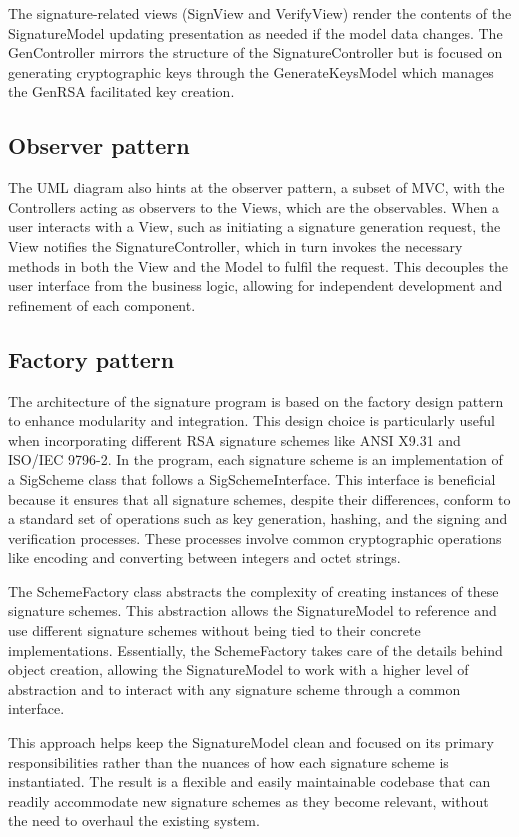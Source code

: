 \documentclass[]{final_report}
\theoremstyle{definition}
\begin{document}
The signature-related views (SignView and VerifyView) render the contents of the SignatureModel updating presentation as needed if the model data changes.
The GenController mirrors the structure of the SignatureController but  is focused on generating cryptographic keys through the GenerateKeysModel which manages the GenRSA facilitated key creation.

\subsection{Observer pattern}
The UML diagram also hints at the observer pattern, a subset of MVC, with the Controllers acting as observers to the Views, which are the observables. When a user interacts with a View, such as initiating a signature generation request, the View notifies the SignatureController, which in turn invokes the necessary methods in both the View and the Model to fulfil the request. This decouples the user interface from the business logic, allowing for independent development and refinement of each component.

\subsection{Factory pattern}
The architecture of the signature program is based on the factory design pattern to enhance modularity and integration. This design choice is particularly useful when incorporating different RSA signature schemes like ANSI X9.31 and ISO/IEC 9796-2. In the program, each signature scheme is an implementation of a SigScheme class that follows a SigSchemeInterface. This interface is beneficial because it ensures that all signature schemes, despite their differences, conform to a standard set of operations such as key generation, hashing, and the signing and verification processes. These processes involve common cryptographic operations like encoding and converting between integers and octet strings.

The SchemeFactory class abstracts the complexity of creating instances of these signature schemes. This abstraction allows the SignatureModel to reference and use different signature schemes without being tied to their concrete implementations. Essentially, the SchemeFactory takes care of the details behind object creation, allowing the SignatureModel to work with a higher level of abstraction and to interact with any signature scheme through a common interface.

This approach helps keep the SignatureModel clean and focused on its primary responsibilities rather than the nuances of how each signature scheme is instantiated. The result is a flexible and easily maintainable codebase that can readily accommodate new signature schemes as they become relevant, without the need to overhaul the existing system.
\end{document}
